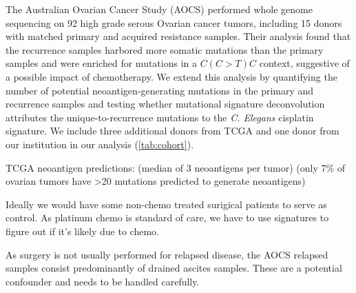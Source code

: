 The Australian Ovarian Cancer Study (AOCS)\cite{Patch_2015} performed whole genome sequencing on 92 high grade serous Ovarian cancer tumors, including 15 donors with matched primary and acquired resistance samples. Their analysis found that the recurrence samples harbored more somatic mutations than the primary samples and were enriched for mutations in a $C(C \gt T)C$ context, suggestive of a possible impact of chemotherapy. We extend this analysis by quantifying the number of potential neoantigen-generating mutations in the primary and recurrence samples and testing whether mutational signature deconvolution attributes the unique-to-recurrence mutations to the \textit{C. Elegans} cisplatin signature. We include three additional donors from TCGA and one donor from our institution in our analysis (\ref{tab:cohort}).

TCGA neoantigen predictions: \cite{Brown_2014} (median of 3 neoantigens per tumor) \cite{Rooney_2015} (only 7\% of ovarian tumors have >20 mutations predicted to generate neoantigens)

Ideally we would have some non-chemo treated surigical patients to serve as control. As platinum chemo is standard of care, we have to use signatures to figure out if it's likely due to chemo.

As surgery is not usually performed for relapsed disease, the AOCS relapsed samples consist predominantly of drained ascites samples. These are a potential confounder and needs to be handled carefully.